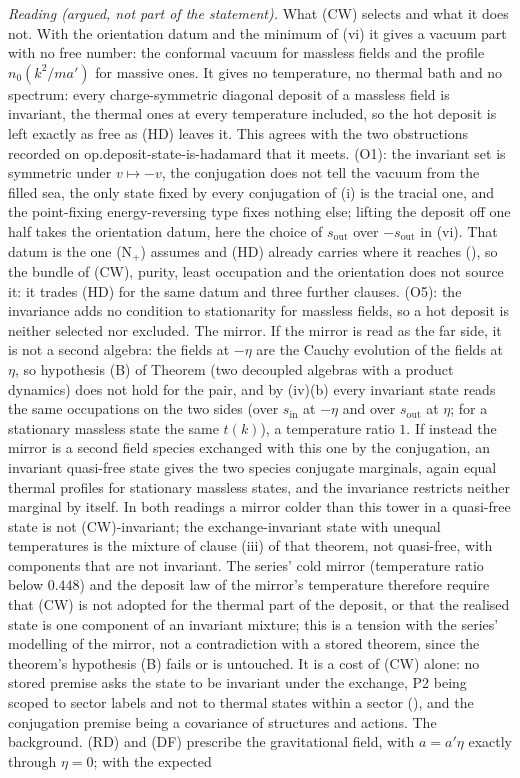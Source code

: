 \emph{Reading (argued, not part of the statement).} What (CW) selects and what it does not. With the orientation datum and the minimum of (vi) it gives a vacuum part with no free number: the conformal vacuum for massless fields and the profile $n_{0}(k^{2}/ma')$ for massive ones. It gives no temperature, no thermal bath and no spectrum: every charge-symmetric diagonal deposit of a massless field is invariant, the thermal ones at every temperature included, so the hot deposit is left exactly as free as (HD) leaves it. This agrees with the two obstructions recorded on op.deposit-state-is-hadamard that it meets. (O1): the invariant set is symmetric under $v \mapsto -v$, the conjugation does not tell the vacuum from the filled sea, the only state fixed by every conjugation of (i) is the tracial one, and the point-fixing energy-reversing type fixes nothing else; lifting the deposit off one half takes the orientation datum, here the choice of $s_{\mathrm{out}}$ over $-s_{\mathrm{out}}$ in (vi). That datum is the one (N$_{+}$) assumes and (HD) already carries where it reaches (), so the bundle of (CW), purity, least occupation and the orientation does not source it: it trades (HD) for the same datum and three further clauses. (O5): the invariance adds no condition to stationarity for massless fields, so a hot deposit is neither selected nor excluded. The mirror. If the mirror is read as the far side, it is not a second algebra: the fields at $-\eta$ are the Cauchy evolution of the fields at $\eta$, so hypothesis (B) of Theorem  (two decoupled algebras with a product dynamics) does not hold for the pair, and by (iv)(b) every invariant state reads the same occupations on the two sides (over $s_{\mathrm{in}}$ at $-\eta$ and over $s_{\mathrm{out}}$ at $\eta$; for a stationary massless state the same $t(k)$), a temperature ratio $1$. If instead the mirror is a second field species exchanged with this one by the conjugation, an invariant quasi-free state gives the two species conjugate marginals, again equal thermal profiles for stationary massless states, and the invariance restricts neither marginal by itself. In both readings a mirror colder than this tower in a quasi-free state is not (CW)-invariant; the exchange-invariant state with unequal temperatures is the mixture of clause (iii) of that theorem, not quasi-free, with components that are not invariant. The series' cold mirror (temperature ratio below $0.448$) and the deposit law of the mirror's temperature therefore require that (CW) is not adopted for the thermal part of the deposit, or that the realised state is one component of an invariant mixture; this is a tension with the series' modelling of the mirror, not a contradiction with a stored theorem, since the theorem's hypothesis (B) fails or is untouched. It is a cost of (CW) alone: no stored premise asks the state to be invariant under the exchange, P2 being scoped to sector labels and not to thermal states within a sector (), and the conjugation premise being a covariance of structures and actions. The background. (RD) and (DF) prescribe the gravitational field, with $a = a'\eta$ exactly through $\eta = 0$; with the expected 